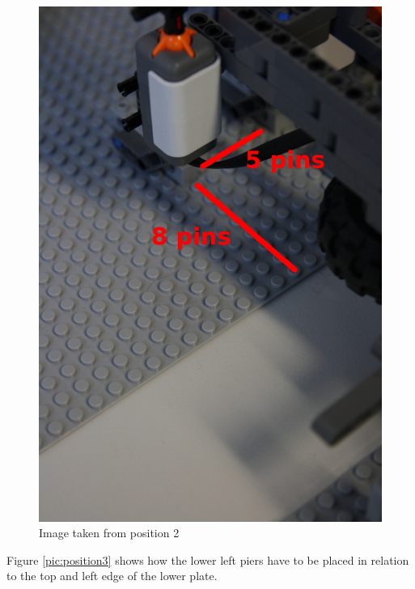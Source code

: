 \documentclass[%
  a4paper,%
  11pt,%
  blue,%
  hyperref	%
  ]{tubsartcl}
\begin{document}
\begin{figure}[!htb]
\begin{center}
\includegraphics[scale=0.35]{graphics_lego/position2.jpg}
\end{center}
\caption{Image taken from position 2}
\label{pic:position2}
\end{figure}

\newpage

Figure \ref{pic:position3} shows how the lower left piers have to be placed in relation to the top and left edge of the lower plate.
\end{document}
